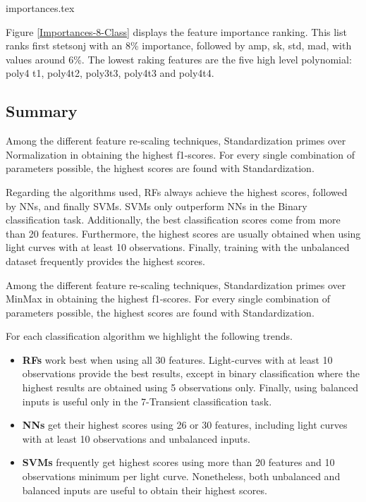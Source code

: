 \documentclass[a4paper,fleqn,usenatbib]{mnras}
\begin{document}
{importances.tex}

Figure \ref{Importances-8-Class} displays the feature importance ranking.
This list ranks first stetson\textunderscore j with an 8\% importance,
followed by amp, sk, std, mad, with values around 6\%. 
The lowest raking features are the five high level polynomial: poly4\textunderscore
t1,  poly4\textunderscore t2, poly3\textunderscore t3,
poly4\textunderscore t3 and poly4\textunderscore t4. 


\subsection{Summary}

Among the different feature re-scaling techniques, Standardization
primes over Normalization in obtaining the highest f1-scores. 
For every single combination of parameters possible, the highest
scores are found with Standardization. 

Regarding the algorithms used, RFs always achieve the highest scores,
followed by NNs, and finally SVMs. 
SVMs only outperform NNs in the Binary classification task. 
Additionally, the best classification scores come from more than 20
features. 
Furthermore, the highest scores are usually obtained when using light
curves with at least 10 observations. 
Finally, training with the unbalanced dataset frequently provides the
highest scores.  

Among the different feature re-scaling techniques, Standardization
primes over MinMax in obtaining the highest f1-scores. 
For every single combination of parameters possible, the highest
scores are found with Standardization. 


For each classification algorithm we highlight the following trends.

\begin{itemize}
    \item \textbf{RFs} work best when using all 30
      features. Light-curves with at least 10 observations provide the best
      results, except in binary classification where the highest
      results are obtained using 5 observations only. Finally, using
      balanced inputs is useful only in the 7-Transient
      classification task.  
    \item \textbf{NNs} get their highest scores using
      26 or 30 features, including light curves with at least 10 observations and
      unbalanced inputs. 
    \item \textbf{SVMs} frequently get highest scores 
      using more than 20 features and 10 observations minimum per
      light curve. Nonetheless, both unbalanced and balanced inputs
      are useful to obtain their highest scores. 
\end{itemize}
\end{document}
